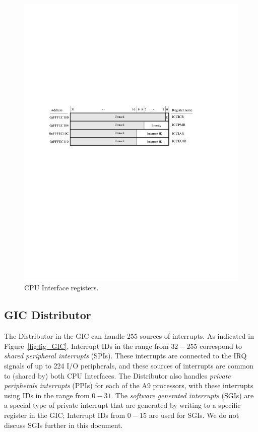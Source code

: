\documentclass[11pt, twoside, pdftex]{article}
\begin{document}
\begin{figure}[h!]
   \begin{center}
       \includegraphics{figures/CPU_IF.pdf}
   \end{center}
   \caption{CPU Interface registers.}
	\label{fig:CPU_IF}
\end{figure}

\subsection{GIC Distributor}
\label{sec:GIC_dist} The Distributor in the GIC can handle 255 sources of interrupts. As
indicated in Figure~\ref{fig:fig_GIC}, Interrupt IDs in the range from $32 - 255$
correspond to {\it shared peripheral interrupts} (SPIs). These interrupts are connected to
the IRQ signals of up to 224 I/O peripherals, and these sources of interrupts are
common to (shared by) both CPU Interfaces. The Distributor also handles {\it private peripherals 
interrupts} (PPIs) for each of the A9 processors, with these interrupts using IDs in the range 
from $0 - 31$. The {\it software generated interrupts} (SGIs) are a special type of
private interrupt that are generated by writing to a specific register in the GIC;
Interrupt IDs from $0 - 15$ are used for SGIs. We do not discuss SGIs further in this
document. 
\end{document}

